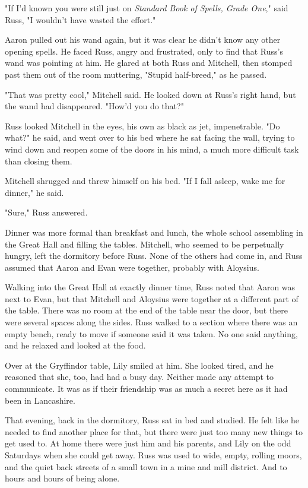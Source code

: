 "If I'd known you were still just on \emph{Standard Book of Spells, Grade One}," said Russ, "I wouldn't have wasted the effort."

Aaron pulled out his wand again, but it was clear he didn't know any other opening spells. He faced Russ, angry and frustrated, only to find that Russ's wand was pointing at him. He glared at both Russ and Mitchell, then stomped past them out of the room muttering, "Stupid half-breed," as he passed.

"That was pretty cool," Mitchell said. He looked down at Russ's right hand, but the wand had disappeared. "How'd you do that?"

Russ looked Mitchell in the eyes, his own as black as jet, impenetrable. "Do what?" he said, and went over to his bed where he sat facing the wall, trying to wind down and reopen some of the doors in his mind, a much more difficult task than closing them.

Mitchell shrugged and threw himself on his bed. "If I fall asleep, wake me for dinner," he said.

"Sure," Russ answered.

Dinner was more formal than breakfast and lunch, the whole school assembling in the Great Hall and filling the tables. Mitchell, who seemed to be perpetually hungry, left the dormitory before Russ. None of the others had come in, and Russ assumed that Aaron and Evan were together, probably with Aloysius.

Walking into the Great Hall at exactly dinner time, Russ noted that Aaron was next to Evan, but that Mitchell and Aloysius were together at a different part of the table. There was no room at the end of the table near the door, but there were several spaces along the sides. Russ walked to a section where there was an empty bench, ready to move if someone said it was taken. No one said anything, and he relaxed and looked at the food.

Over at the Gryffindor table, Lily smiled at him. She looked tired, and he reasoned that she, too, had had a busy day. Neither made any attempt to communicate. It was as if their friendship was as much a secret here as it had been in Lancashire.

That evening, back in the dormitory, Russ sat in bed and studied. He felt like he needed to find another place for that, but there were just too many new things to get used to. At home there were just him and his parents, and Lily on the odd Saturdays when she could get away. Russ was used to wide, empty, rolling moors, and the quiet back streets of a small town in a mine and mill district. And to hours and hours of being alone.

